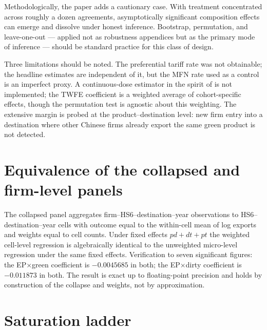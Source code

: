 \documentclass[12pt]{article}
\begin{document}
Methodologically, the paper adds a cautionary case. With treatment concentrated across
roughly a dozen agreements, asymptotically significant composition effects can emerge and
dissolve under honest inference. Bootstrap, permutation, and leave-one-out --- applied not
as robustness appendices but as the primary mode of inference --- should be standard
practice for this class of design.

Three limitations should be noted. The preferential tariff rate was not obtainable; the headline
estimates are independent of it, but the MFN rate used as a control is an imperfect proxy.
A continuous-dose estimator in the spirit of \citet{callaway2024} is not implemented; the
TWFE coefficient is a weighted average of cohort-specific effects, though the permutation
test is agnostic about this weighting. The extensive margin is probed at the
product--destination level: new firm entry into a destination where other Chinese firms
already export the same green product is not detected.

\printbibliography

\appendix

\section{Equivalence of the collapsed and firm-level panels}\label{app:pddt}

The collapsed panel aggregates firm--HS6--destination--year observations to
HS6--destination--year cells with outcome equal to the within-cell mean of log exports
and weights equal to cell counts. Under fixed effects $pd + dt + pt$ the weighted
cell-level regression is algebraically identical to the unweighted micro-level regression
under the same fixed effects. Verification to seven significant figures: the
EP$\times$green coefficient is $-0.0045685$ in both; the EP$\times$dirty coefficient is
$-0.011873$ in both. The result is exact up to floating-point precision and holds by
construction of the collapse and weights, not by approximation.

\section{Saturation ladder}\label{app:ladder}
\end{document}
